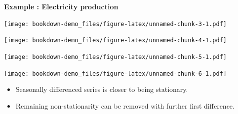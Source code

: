 \documentclass[]{book}
\newenvironment{Shaded}{\begin{snugshade}}{\end{snugshade}}
\newcommand{\DecValTok}[1]{\textcolor[rgb]{0.00,0.00,0.81}{#1}}
\newcommand{\KeywordTok}[1]{\textcolor[rgb]{0.13,0.29,0.53}{\textbf{#1}}}
\newcommand{\NormalTok}[1]{#1}
\newcommand{\OperatorTok}[1]{\textcolor[rgb]{0.81,0.36,0.00}{\textbf{#1}}}
\newcommand{\StringTok}[1]{\textcolor[rgb]{0.31,0.60,0.02}{#1}}
\providecommand{\tightlist}{%
  \setlength{\itemsep}{0pt}\setlength{\parskip}{0pt}}
\begin{document}
\newpage

\textbf{Example : Electricity production}

\begin{Shaded}
\end{Shaded}

\texttt{[image: bookdown-demo\_files/figure-latex/unnamed-chunk-3-1.pdf]}

\begin{Shaded}
\end{Shaded}

\texttt{[image: bookdown-demo\_files/figure-latex/unnamed-chunk-4-1.pdf]}

\begin{Shaded}
\end{Shaded}

\texttt{[image: bookdown-demo\_files/figure-latex/unnamed-chunk-5-1.pdf]}

\begin{Shaded}
\end{Shaded}

\texttt{[image: bookdown-demo\_files/figure-latex/unnamed-chunk-6-1.pdf]}

\begin{itemize}
\tightlist
\item
  Seasonally differenced series is closer to being stationary.
\item
  Remaining non-stationarity can be removed with further first difference.
\end{itemize}
\end{document}
